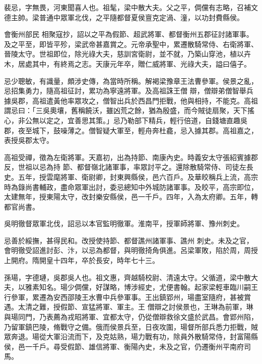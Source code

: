 
\begin{pinyinscope}

 裴忌，字無畏，河東聞喜人也。祖髦，梁中散大夫。父之平，倜儻有志略，召補文德主帥。梁普通中眾軍北伐，之平隨都督夏侯亶克定渦、潼，以功封費縣侯。



 會衡州部民
 相聚寇抄，詔以之平為假節、超武將軍、都督衡州五郡征討諸軍事。及之平至，即皆平殄，梁武帝甚嘉賞之。元帝承聖中，累遷散騎常侍、右衛將軍、晉陵太守。世祖即位，除光祿大夫，慈訓宮衛尉，並不就，乃築山穿池，植以卉木，居處其中，有終焉之志。天康元年卒，贈仁威將軍、光祿大夫，謚曰僖子。



 忌少聰敏，有識量，頗涉史傳，為當時所稱。解褐梁豫章王法曹參軍。侯景之亂，忌招集勇力，隨高祖征討，累功為寧遠將軍。及高祖誅王僧
 辯，僧辯弟僧智舉兵據吳郡，高祖遣黃他率眾攻之，僧智出兵於西昌門拒戰，他與相持，不能克。高祖謂忌曰：「三吳奧壤，舊稱饒沃，雖凶荒之餘，猶為殷盛，而今賊徒扇聚，天下搖心，非公無以定之，宜善思其策。」忌乃勒部下精兵，輕行倍道，自錢塘直趣吳郡，夜至城下，鼓噪薄之。僧智疑大軍至，輕舟奔杜龕，忌入據其郡。高祖嘉之，表授吳郡太守。



 高祖受禪，徵為左衛將軍。天嘉初，出為持節、南康內史。時義安太守張紹賓據郡反，世祖以忌為持
 節、都督嶺北諸軍事，率眾討平之。還除散騎常侍、司徒左長史。五年，授雲麾將軍、衛尉卿，封東興縣侯，邑六百戶。及華皎稱兵上流，高宗時為錄尚書輔政，盡命眾軍出討，委忌總知中外城防諸軍事。及皎平，高宗即位，太建無年，授東陽太守，改封樂安縣侯，邑一千戶。四年，入為太府卿。五年，轉都官尚書。



 吳明徹督眾軍北伐，詔忌以本官監明徹軍。淮南平，授軍師將軍、豫州刺史。



 忌善於綏撫，甚得民和。改授使持節、都督譙州諸軍事、譙州
 刺史。未及之官，會明徹受詔進討彭、汴，以忌為都督，與明徹掎角俱進。呂梁軍敗，陷於周，周授上開府。隋開皇十四年，卒於長安，時年七十三。



 孫瑒，字德璉，吳郡吳人也。祖文惠，齊越騎校尉、清遠太守。父循道，梁中散大夫，以雅素知名。瑒少倜儻，好謀略，博涉經史，尤便書翰。起家梁輕車臨川嗣王行參軍，累遷為安西邵陵王水曹中兵參軍事。王出鎮郢州，瑒盡室隨府，甚被賞遇。太清之難，授假節、宣猛將軍、軍主。王
 僧辯之討侯景也，王琳為前軍，琳與瑒同門，乃表薦為戎昭將軍、宜都太守，仍從僧辯救徐文盛於武昌。會郢州陷，乃留軍鎮巴陵，脩戰守之備。俄而侯景兵至，日夜攻圍，瑒督所部兵悉力拒戰，賊眾奔退。瑒從大軍沿流而下，及克姑熟，瑒力戰有功，除員外散騎常侍，封富陽縣侯，邑一千戶。尋受假節、雄信將軍、衡陽內史，未及之官，仍遷衡州平南府司馬。




\end{pinyinscope}
